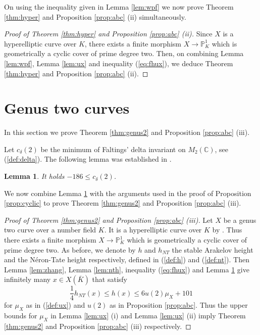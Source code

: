 \documentclass[11pt]{article}
\newtheorem{lemma}[theorem]{Lemma}
\numberwithin{equation}{section}
\newcommand {\CC}  {{\mathbb C}}
\newcommand {\p} {x}
\begin{document}
On using the inequality given in Lemma \ref{lem:wpf} we now prove Theorem \ref{thm:hyper} and Proposition \ref{prop:abc} (ii) simultaneously.

\begin{proof}[Proof of Theorem \ref{thm:hyper} and Proposition \ref{prop:abc} (ii)]
Since $X$ is a hyperelliptic curve over $K$, there exists a finite morphism $X\to \mathbb P^1_K$  which is geometrically a cyclic cover of prime degree two. Then, on combining Lemma \ref{lem:wpf}, Lemma \ref{lem:ux} and inequality (\ref{eq:fhux}), we deduce Theorem \ref{thm:hyper} and Proposition \ref{prop:abc} (ii).
\end{proof}


\section{Genus two curves}\label{sec:genus2}

In this section we prove Theorem \ref{thm:genus2} and Proposition \ref{prop:abc} (iii). 

Let $c_\delta(2)$ be the minimum of Faltings' delta invariant on $M_2(\CC)$, see (\ref{def:delta}). The following lemma was established in \cite[Proposition 5.1 (v)]{rvk:szpiro}.  

\begin{lemma}\label{lem:dx}
It holds $-186\leq c_\delta(2)$.
\end{lemma}


We now combine Lemma \ref{lem:dx} with the arguments used in the proof of Proposition \ref{prop:cyclic} to prove Theorem \ref{thm:genus2} and Proposition \ref{prop:abc} (iii).
\begin{proof}[Proof of Theorem \ref{thm:genus2} and Proposition \ref{prop:abc} (iii)]
Let $X$ be a genus two curve  over a number field $K$. It is a hyperelliptic curve over $K$ by  \cite[Proposition 7.4.9]{liu:ag}. Thus there exists a finite morphism $X\to \mathbb P^1_K$ which is geometrically a cyclic cover of prime degree two. As before, we denote by $h$ and $h_{NT}$ the stable Arakelov height and the N\'eron-Tate height respectively, defined in (\ref{def:h}) and (\ref{def:nt}). Then  Lemma \ref{lem:zhang}, Lemma \ref{lem:nth}, inequality (\ref{eq:fhux}) and Lemma \ref{lem:dx} give infinitely many $x\in X(\bar{K})$ that satisfy 
$$\frac{1}{4}h_{NT}(\p)\leq h(\p)\leq 6u(2)\mu_X+101$$ for $\mu_X$ as in (\ref{def:ux}) and $u(2)$ as in Proposition \ref{prop:abc}. Thus the upper bounds for $\mu_X$ in Lemma \ref{lem:ux} (i) and Lemma \ref{lem:ux} (ii)  imply Theorem \ref{thm:genus2} and Proposition \ref{prop:abc} (iii) respectively. 
\end{proof}
\end{document}
